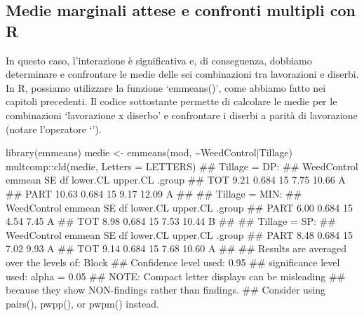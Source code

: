 \documentclass[a4paper,12pt,oneside]{book}
\newenvironment{Shaded}{\begin{snugshade}}{\end{snugshade}}
\newcommand{\SpecialCharTok}[1]{#1}
\newcommand{\DocumentationTok}[1]{#1}
\newcommand{\OtherTok}[1]{#1}
\newcommand{\FunctionTok}[1]{#1}
\newcommand{\AttributeTok}[1]{#1}
\newcommand{\AlertTok}[1]{#1}
\newcommand{\NormalTok}[1]{#1}
\begin{document}
\hypertarget{medie-marginali-attese-e-confronti-multipli-con-r}{%
\subsection{Medie marginali attese e confronti multipli con R}\label{medie-marginali-attese-e-confronti-multipli-con-r}}

In questo caso, l'interazione è significativa e, di conseguenza, dobbiamo determinare e confrontare le medie delle sei combinazioni tra lavorazioni e diserbi. In R, possiamo utilizzare la funzione `emmeans()', come abbiamo fatto nei capitoli precedenti. Il codice sottostante permette di calcolare le medie per le combinazioni `lavorazione x diserbo' e confrontare i diserbi a parità di lavorazione (notare l'operatore `\textbar{}').

\begin{Shaded}
\begin{Highlighting}[]
\FunctionTok{library}\NormalTok{(emmeans)}
\NormalTok{medie }\OtherTok{\textless{}{-}} \FunctionTok{emmeans}\NormalTok{(mod, }\SpecialCharTok{\textasciitilde{}}\NormalTok{WeedControl}\SpecialCharTok{|}\NormalTok{Tillage)}
\NormalTok{multcomp}\SpecialCharTok{::}\FunctionTok{cld}\NormalTok{(medie, }\AttributeTok{Letters =}\NormalTok{ LETTERS)}
\DocumentationTok{\#\# Tillage = DP:}
\DocumentationTok{\#\#  WeedControl emmean    SE df lower.CL upper.CL .group}
\DocumentationTok{\#\#  TOT           9.21 0.684 15     7.75    10.66  A    }
\DocumentationTok{\#\#  PART         10.63 0.684 15     9.17    12.09  A    }
\DocumentationTok{\#\# }
\DocumentationTok{\#\# Tillage = MIN:}
\DocumentationTok{\#\#  WeedControl emmean    SE df lower.CL upper.CL .group}
\DocumentationTok{\#\#  PART          6.00 0.684 15     4.54     7.45  A    }
\DocumentationTok{\#\#  TOT           8.98 0.684 15     7.53    10.44   B   }
\DocumentationTok{\#\# }
\DocumentationTok{\#\# Tillage = SP:}
\DocumentationTok{\#\#  WeedControl emmean    SE df lower.CL upper.CL .group}
\DocumentationTok{\#\#  PART          8.48 0.684 15     7.02     9.93  A    }
\DocumentationTok{\#\#  TOT           9.14 0.684 15     7.68    10.60  A    }
\DocumentationTok{\#\# }
\DocumentationTok{\#\# Results are averaged over the levels of: Block }
\DocumentationTok{\#\# Confidence level used: 0.95 }
\DocumentationTok{\#\# significance level used: alpha = 0.05 }
\DocumentationTok{\#\# }\AlertTok{NOTE}\DocumentationTok{: Compact letter displays can be misleading}
\DocumentationTok{\#\#       because they show NON{-}findings rather than findings.}
\DocumentationTok{\#\#       Consider using \textquotesingle{}pairs()\textquotesingle{}, \textquotesingle{}pwpp()\textquotesingle{}, or \textquotesingle{}pwpm()\textquotesingle{} instead.}
\end{Highlighting}
\end{Shaded}
\end{document}
